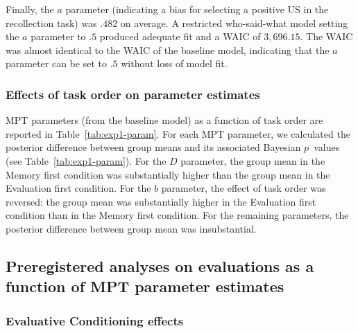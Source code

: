 \documentclass[
  man,floatsintext]{apa6}
\begin{document}
Finally, the \(a\) parameter (indicating a bias for selecting a positive US in the recollection task) was \(.482\) on average.
A restricted who-said-what model setting the \(a\) parameter to \(.5\) produced adequate fit and a WAIC of \(3,696.15\).
The WAIC was almost identical to the WAIC of the baseline model, indicating that the \(a\) parameter can be set to \(.5\) without loss of model fit.

\hypertarget{effects-of-task-order-on-parameter-estimates}{%
\subsubsection{Effects of task order on parameter estimates}\label{effects-of-task-order-on-parameter-estimates}}

MPT parameters (from the baseline model) as a function of task order are reported in Table~\ref{tab:exp1-param}.
For each MPT parameter, we calculated the posterior difference between group means and its associated Bayesian \(p\)~values (see Table~\ref{tab:exp1-param}).
For the \(D\) parameter, the group mean in the Memory first condition was substantially higher than the group mean in the Evaluation first condition.
For the \(b\) parameter, the effect of task order was reversed: the group mean was substantially higher in the Evaluation first condition than in the Memory first condition.
For the remaining parameters, the posterior difference between group mean was insubstantial.

\hypertarget{preregistered-analyses-on-evaluations-as-a-function-of-mpt-parameter-estimates}{%
\subsection{Preregistered analyses on evaluations as a function of MPT parameter estimates}\label{preregistered-analyses-on-evaluations-as-a-function-of-mpt-parameter-estimates}}

\hypertarget{evaluative-conditioning-effects}{%
\subsubsection{Evaluative Conditioning effects}\label{evaluative-conditioning-effects}}
\end{document}

